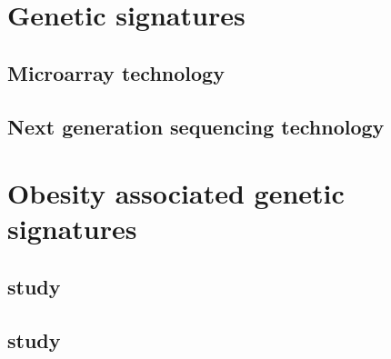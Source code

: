 

\section{Genetic signatures}
\label{sec:genetic_signatures}

\subsection{Microarray technology}
\label{subsec:microarray_technology}

\subsection{Next generation sequencing technology}
\label{sub:next_generation sequencing_technology}





\section{Obesity associated genetic signatures}
\label{sec:obesity_associated_genetic_signatures}

\subsection{\citet{Creighton2012} study}
\label{sub:creighton_study}



\subsection{\citet{Fuentes-Mattei2014} study}
\label{sub:fuentes_mattei_study}




